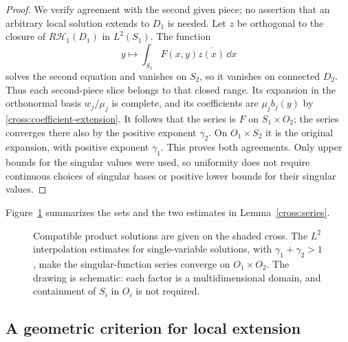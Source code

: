 \begin{proof}
We verify agreement with the second given piece; no assertion that
an arbitrary local solution extends to $D_1$ is needed.  Let $z$ be
orthogonal to the closure of $R\mathcal H_1(D_1)$ in $L^2(S_1)$.
The function
\[
 y\longmapsto\int_{S_1}F(x,y)\overline{z(x)}\,\dd x
\]
solves the second equation and vanishes on $S_2$, so it vanishes on
connected $D_2$.  Thus each second-piece slice belongs to that closed
range.  Its expansion in the orthonormal basis $w_j/\mu_j$ is complete,
and its coefficients are $\mu_jb_j(y)$ by
\eqref{cross:coefficient-extension}.  It follows that the series is
$F$ on $S_1\times O_2$; the series converges there also by the positive
exponent $\gamma_2$.  On $O_1\times S_2$ it is the original expansion,
with positive exponent $\gamma_1$.  This proves both agreements.
Only upper bounds for the singular values were used, so uniformity
does not require continuous choices of singular bases or positive
lower bounds for their singular values.
\end{proof}

Figure~\ref{cross:figure} summarizes the sets and the two estimates in
Lemma~\ref{cross:series}.
\begin{figure}[htbp]
 \centering
 
 \caption{Compatible product solutions are given on the shaded cross.
 The $L^2$ interpolation estimates for single-variable solutions,
 with $\gamma_1+\gamma_2>1$, make the
 singular-function series converge on $O_1\times O_2$.
 The drawing is schematic: each factor is a multidimensional domain,
 and containment of $S_i$ in $O_i$ is not required.}
 \label{cross:figure}
\end{figure}

\subsection{A geometric criterion for local extension}

